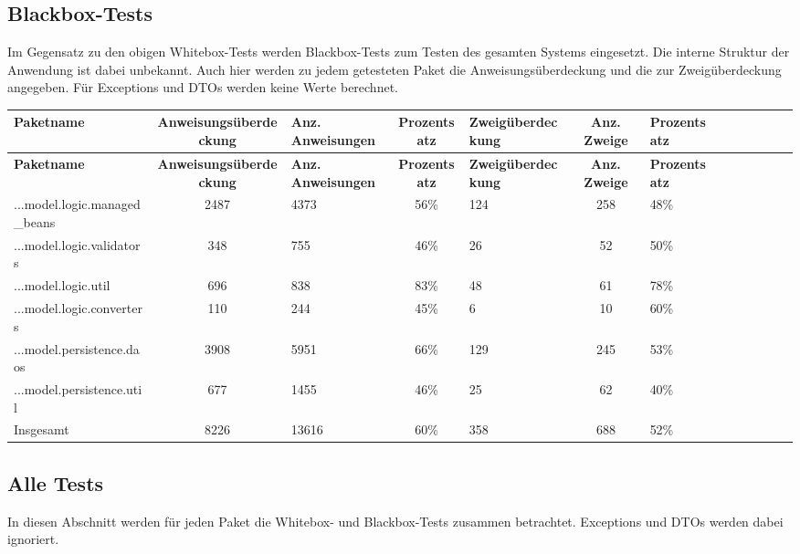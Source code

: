 \documentclass{article}
\begin{document}
\subsection{Blackbox-Tests}

Im Gegensatz zu den obigen Whitebox-Tests werden Blackbox-Tests zum Testen des gesamten Systems eingesetzt. Die interne Struktur der Anwendung ist dabei unbekannt. 
Auch hier werden zu jedem getesteten Paket die Anweisungsüberdeckung und die zur Zweigüberdeckung angegeben. 
Für Exceptions und DTOs werden keine Werte berechnet.

\begin{longtable}{@{}lclclclclclcl@{}}
\toprule
\textbf{Paketname} & \textbf{Anweisungsüberdeckung} & \textbf{Anz. Anweisungen} & \textbf{Prozentsatz} & \textbf{Zweigüberdeckung} & \textbf{Anz. Zweige} & \textbf{Prozentsatz} \\* \midrule
\endfirsthead
\textbf{Paketname} & \textbf{Anweisungsüberdeckung} & \textbf{Anz. Anweisungen} & \textbf{Prozentsatz} & \textbf{Zweigüberdeckung} & \textbf{Anz. Zweige} & \textbf{Prozentsatz} \\* \midrule
\endhead
...model.logic.managed\_beans 	& 2487 		& 4373 		& 56\% 		& 124 		& 258 		& 48\% \\
...model.logic.validators 		& 348 		& 755 		& 46\% 		& 26 			& 52 			& 50\% \\
...model.logic.util 			& 696 		& 838 		& 83\% 		& 48 			& 61 			& 78\% \\
...model.logic.converters 		& 110 		& 244 		& 45\% 		& 6 			& 10 			& 60\% \\
...model.persistence.daos 		& 3908 		& 5951 		& 66\% 		& 129 		& 245 		& 53\% \\
...model.persistence.util 		& 677 		& 1455 		& 46\% 		& 25 			& 62 			& 40\% \\
Insgesamt 						& 8226            	& 13616            & 60\%            	& 358            	& 688            	& 52\% \\* \bottomrule
\end{longtable}

\subsection{Alle Tests}

In diesen Abschnitt werden für jeden Paket die Whitebox- und Blackbox-Tests zusammen betrachtet. Exceptions und DTOs werden dabei ignoriert.
\end{document}
